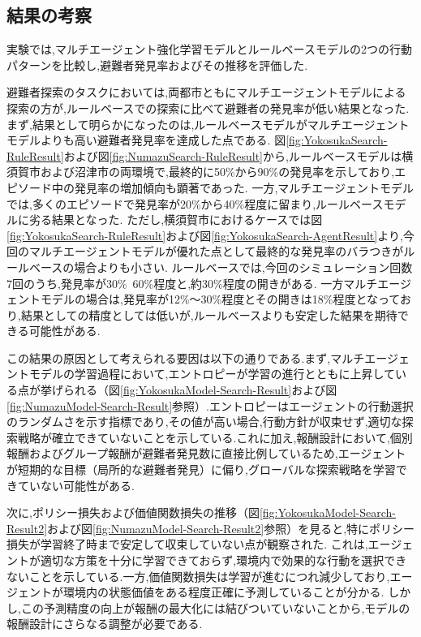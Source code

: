 \subsection{結果の考察}
実験では,マルチエージェント強化学習モデルとルールベースモデルの2つの行動パターンを比較し,避難者発見率およびその推移を評価した.

避難者探索のタスクにおいては,両都市ともにマルチエージェントモデルによる探索の方が,ルールベースでの探索に比べて避難者の発見率が低い結果となった.
まず,結果として明らかになったのは,ルールベースモデルがマルチエージェントモデルよりも高い避難者発見率を達成した点である.
図\ref{fig:YokosukaSearch-RuleResult}および図\ref{fig:NumazuSearch-RuleResult}から,ルールベースモデルは横須賀市および沼津市の両環境で,最終的に50\%から90\%の発見率を示しており,エピソード中の発見率の増加傾向も顕著であった.
一方,マルチエージェントモデルでは,多くのエピソードで発見率が20\%から40\%程度に留まり,ルールベースモデルに劣る結果となった.
ただし,横須賀市におけるケースでは図\ref{fig:YokosukaSearch-RuleResult}および図\ref{fig:YokosukaSearch-AgentResult}より,今回のマルチエージェントモデルが優れた点として最終的な発見率のバラつきがルールベースの場合よりも小さい.
ルールベースでは,今回のシミュレーション回数7回のうち,発見率が30\%~60\%程度と,約30\%程度の開きがある.
一方マルチエージェントモデルの場合は,発見率が12\%～30\%程度とその開きは18\%程度となっており,結果としての精度としては低いが,ルールベースよりも安定した結果を期待できる可能性がある.


この結果の原因として考えられる要因は以下の通りである.まず,マルチエージェントモデルの学習過程において,エントロピーが学習の進行とともに上昇している点が挙げられる（図\ref{fig:YokosukaModel-Search-Result}および図\ref{fig:NumazuModel-Search-Result}参照）.エントロピーはエージェントの行動選択のランダムさを示す指標であり,その値が高い場合,行動方針が収束せず,適切な探索戦略が確立できていないことを示している.これに加え,報酬設計において,個別報酬およびグループ報酬が避難者発見数に直接比例しているため,エージェントが短期的な目標（局所的な避難者発見）に偏り,グローバルな探索戦略を学習できていない可能性がある.

次に,ポリシー損失および価値関数損失の推移（図\ref{fig:YokosukaModel-Search-Result2}および図\ref{fig:NumazuModel-Search-Result2}参照）を見ると,特にポリシー損失が学習終了時まで安定して収束していない点が観察された.
これは,エージェントが適切な方策を十分に学習できておらず,環境内で効果的な行動を選択できないことを示している.一方,価値関数損失は学習が進むにつれ減少しており,エージェントが環境内の状態価値をある程度正確に予測していることが分かる.
しかし,この予測精度の向上が報酬の最大化には結びついていないことから,モデルの報酬設計にさらなる調整が必要である.

